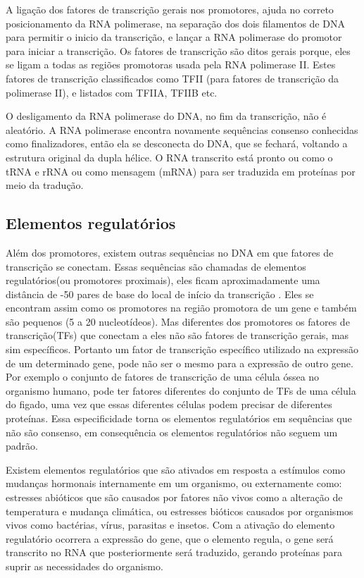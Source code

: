 A ligação dos fatores de transcrição gerais nos promotores, ajuda no correto posicionamento da RNA polimerase, na separação dos dois filamentos de DNA para permitir o inicio da transcrição, e lançar a RNA polimerase do promotor para iniciar a transcrição. Os fatores de transcrição são ditos gerais porque, eles se ligam a todas as regiões promotoras usada pela RNA polimerase II. Estes fatores de transcrição classificados como TFII (para fatores de transcrição da polimerase II), e listados com TFIIA, TFIIB etc. %

O desligamento da RNA polimerase do DNA, no fim da transcrição, não é aleatório. A RNA polimerase encontra novamente sequências consenso conhecidas como finalizadores, então ela se desconecta do DNA, que se fechará, voltando a estrutura original da dupla hélice. O RNA transcrito está pronto ou como o tRNA e rRNA ou como mensagem (mRNA) para ser traduzida em proteínas por meio da tradução.

\subsection{Elementos regulatórios}

Além dos promotores, existem outras sequências no DNA em que fatores de transcrição se conectam. Essas sequências são chamadas de elementos regulatórios(ou promotores proximais), eles ficam aproximadamente uma distância de -50 pares de base do local de início da transcrição \cite{Zaha2000}. Eles se encontram assim como os promotores na região promotora de um gene e também são pequenos (5 a 20 nucleotídeos). Mas diferentes dos promotores os fatores de transcrição(TFs) que conectam a eles não são fatores de transcrição gerais, mas sim específicos. Portanto um fator de transcrição específico utilizado na expressão de um determinado gene, pode não ser o mesmo para a expressão de outro gene. Por exemplo o conjunto de fatores de transcrição de uma célula óssea no organismo humano, pode ter fatores diferentes do conjunto de TFs de uma célula do figado, uma vez que essas diferentes células podem precisar de diferentes proteínas. Essa especificidade torna os elementos regulatórios em sequências que não são consenso, em consequência os elementos regulatórios não seguem um padrão.

Existem elementos regulatórios que são ativados em resposta a estímulos como mudanças hormonais internamente em um organismo, ou externamente como: estresses abióticos que são causados por fatores não vivos como a alteração de temperatura e mudança climática, ou estresses bióticos causados por organismos vivos como bactérias, vírus, parasitas e insetos. Com a ativação do elemento regulatório ocorrera a expressão do gene, que o elemento regula, o gene será transcrito no RNA que posteriormente será traduzido, gerando proteínas para suprir as necessidades do organismo.

